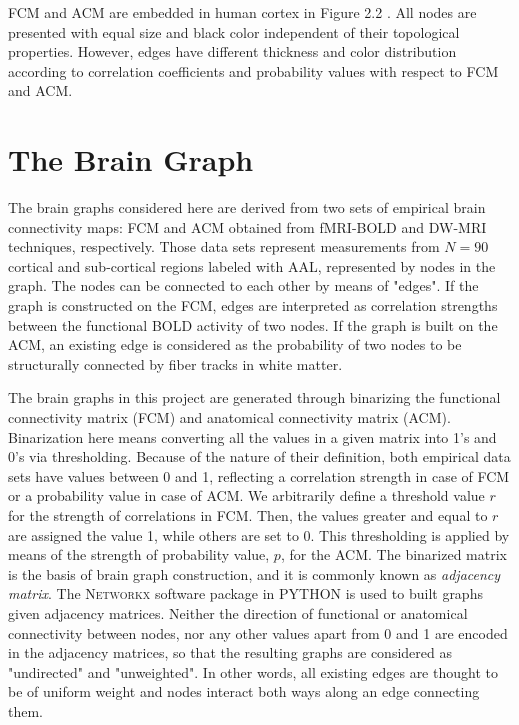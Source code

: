 FCM and ACM are embedded in human cortex in Figure 2.2 \citep{XYZ13}. All nodes are presented with equal size and black color independent of their topological properties. However, edges have different thickness and color distribution according to correlation coefficients and probability values with respect to FCM and ACM. 
 
   
\section{The Brain Graph}

The brain graphs considered here are derived from two sets of empirical brain connectivity maps: FCM and ACM obtained from fMRI-BOLD and DW-MRI techniques, respectively. Those data sets represent measurements from $N=90$ cortical and sub-cortical regions labeled with AAL, represented by nodes in the graph. The nodes can be connected to each other by means of "edges". If the graph is constructed on the FCM, edges are interpreted as correlation strengths between the functional BOLD activity of two nodes. If the graph is built on the ACM, an existing edge is considered as the probability of two nodes to be structurally connected by fiber tracks in white matter.

The brain graphs in this project are generated through binarizing the functional connectivity matrix (FCM) and anatomical connectivity matrix (ACM). Binarization here means converting all the values in a given matrix into 1's and 0's via thresholding. Because of the nature of their definition, both empirical data sets have values between 0 and 1, reflecting a correlation strength in case of FCM or a probability value in case of ACM. We arbitrarily define a threshold value $r$ for the strength of correlations in FCM. Then, the values greater and equal to $r$ are assigned the value 1, while others are set to 0. This thresholding is applied by means of the strength of probability value, $p$, for the ACM. The binarized matrix is the basis of brain graph construction, and it is commonly known as \textit{adjacency matrix}. The \textsc{Networkx} software package in \textsc{PYTHON} is used to built graphs given adjacency matrices. Neither the direction of functional or anatomical connectivity between nodes, nor any other values apart from 0 and 1  are encoded in the adjacency matrices,  so that the resulting graphs are considered as "undirected" and "unweighted". In other words, all existing edges are thought to be of uniform weight and nodes interact both ways along an edge connecting them. 

